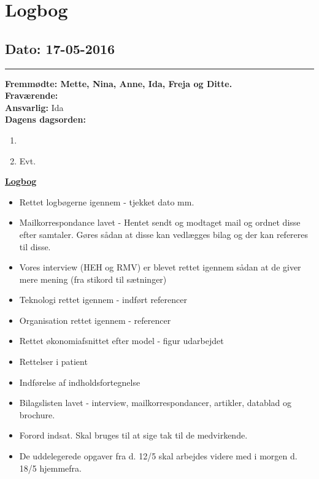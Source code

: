 \chapter{Logbog}
\section{Dato: 17-05-2016}
\hrule
\textbf{Fremmødte: Mette, Nina, Anne, Ida, Freja og Ditte.} \\
\textbf{Fraværende:} \\
\textbf{Ansvarlig:} Ida \\
\textbf{Dagens dagsorden: }
\begin{enumerate}
	\item 
	\item Evt.
\end{enumerate}

\underline{\textbf{Logbog}}
\begin{itemize}
\item Rettet logbøgerne igennem - tjekket dato mm.
\item Mailkorrespondance lavet - Hentet sendt og modtaget mail og ordnet disse efter samtaler. Gøres sådan at disse kan vedlægges bilag og der kan refereres til disse.
\item Vores interview (HEH og RMV) er blevet rettet igennem sådan at de giver mere mening (fra stikord til sætninger)
\item Teknologi rettet igennem - indført referencer
\item Organisation rettet igennem - referencer 
\item Rettet økonomiafsnittet efter model - figur udarbejdet
\item Rettelser i patient
\item Indførelse af indholdsfortegnelse
\item Bilagslisten lavet - interview, mailkorrespondancer, artikler, datablad og brochure.
\item Forord indsat. Skal bruges til at sige tak til de medvirkende.
\item De uddelegerede opgaver fra d. 12/5 skal arbejdes videre med i morgen d. 18/5 hjemmefra.
\end{itemize}

\newpage